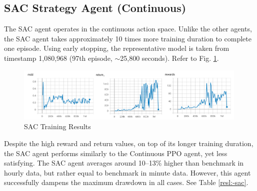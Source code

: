 \subsection{SAC Strategy Agent (Continuous)}
The SAC agent operates in the continuous action space. Unlike the other agents, the SAC agent takes approximately 10 times more training duration to complete one episode. Using early stopping, the representative model is taken from timestamp 1,080,968 (97th episode, $\sim$25,800 seconds). Refer to Fig. \ref{gr:sac:train}.

\begin{figure}[H]
    \centering
    \includegraphics[width=0.99\textwidth]{graphics/trainphoto/sac-train.png}
    \caption{SAC Training Results}
    \label{gr:sac:train}
\end{figure}

Despite the high reward and return values, on top of its longer training duration, the SAC agent performs similarly to the Continuous PPO agent, yet less satisfying. The SAC agent averages around 10–13\% higher than benchmark in hourly data, but rather equal to benchmark in minute data. However, this agent successfully dampens the maximum drawdown in all cases. See Table \ref{resl:-sac}.

